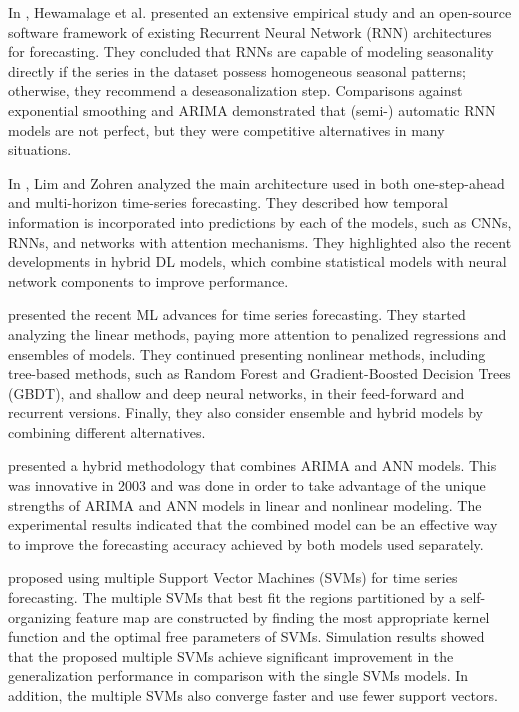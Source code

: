 In \cite{HEWAMALAGE2021388}, Hewamalage et al. presented an extensive empirical study and an open-source software framework of existing Recurrent Neural Network (RNN) architectures for forecasting.
They concluded that RNNs are capable of modeling seasonality directly if the series in the dataset possess homogeneous seasonal patterns; otherwise, they recommend a deseasonalization step.
Comparisons against exponential smoothing and ARIMA demonstrated that (semi-) automatic RNN models are not perfect, but they were competitive alternatives in many situations.

In \cite{Lim2021}, Lim and Zohren analyzed the main architecture used in both one-step-ahead and multi-horizon time-series forecasting.
They described how temporal information is incorporated into predictions by each of the models, such as CNNs, RNNs, and networks with attention mechanisms.
They highlighted also the recent developments in hybrid DL models, which combine statistical models with neural network components to improve performance.

\cite{Masini2023} presented the recent ML advances for time series forecasting.
They started analyzing the linear methods, paying more attention to penalized regressions and ensembles of models.
They continued presenting nonlinear methods, including tree-based methods, such as Random Forest and Gradient-Boosted Decision Trees (GBDT), and shallow and deep neural networks, in their feed-forward and recurrent versions.
Finally, they also consider ensemble and hybrid models by combining different alternatives.

\cite{ZHANG2003159} presented a hybrid methodology that combines ARIMA and ANN models.
This was innovative in 2003 and was done in order to take advantage of the unique strengths of ARIMA and ANN models in linear and nonlinear modeling.
The experimental results indicated that the combined model can be an effective way to improve the forecasting accuracy achieved by both models used separately.

\cite{CAO2003321} proposed using multiple Support Vector Machines (SVMs) for time series forecasting.
The multiple SVMs that best fit the regions partitioned by a self-organizing feature map are constructed by finding the most appropriate kernel function and the optimal free parameters of SVMs.
Simulation results showed that the proposed multiple SVMs achieve significant improvement in the generalization performance in comparison with the single SVMs models.
In addition, the multiple SVMs also converge faster and use fewer support vectors.

